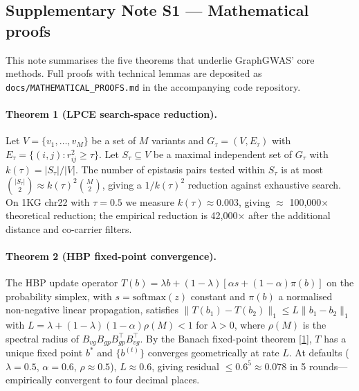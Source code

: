\clearpage


\subsection*{Supplementary Note S1 --- Mathematical proofs}\label{snote:proofs}

This note summarises the five theorems that underlie GraphGWAS'
core methods. Full proofs with technical lemmas are deposited as
\texttt{docs/MATHEMATICAL\_PROOFS.md} in the accompanying code
repository.

\paragraph{Theorem 1 (LPCE search-space reduction).}
Let $V = \{v_1, \dots, v_M\}$ be a set of $M$ variants and
$G_\tau = (V, E_\tau)$ with $E_\tau = \{(i,j) : r^2_{ij} \geq \tau\}$.
Let $S_\tau \subseteq V$ be a maximal independent set of $G_\tau$
with $k(\tau) = |S_\tau|/|V|$. The number of epistasis pairs tested
within $S_\tau$ is at most
$\binom{|S_\tau|}{2} \approx k(\tau)^2 \binom{M}{2}$, giving a
$1/k(\tau)^2$ reduction against exhaustive search. On 1KG chr22
with $\tau{=}0.5$ we measure $k(\tau) \approx 0.003$, giving
$\approx$ 100{,}000$\times$ theoretical reduction; the empirical
reduction is 42{,}000$\times$ after the additional distance and
co-carrier filters.

\paragraph{Theorem 2 (HBP fixed-point convergence).}
The HBP update operator
$T(b) = \lambda b + (1-\lambda)[\alpha s + (1-\alpha) \pi(b)]$ on
the probability simplex, with $s = \text{softmax}(z)$ constant and
$\pi(b)$ a normalised non-negative linear propagation, satisfies
$\|T(b_1) - T(b_2)\|_1 \leq L \|b_1 - b_2\|_1$ with
$L = \lambda + (1-\lambda)(1-\alpha) \rho(M) < 1$ for $\lambda > 0$,
where $\rho(M)$ is the spectral radius of
$B_{vg} B_{gp} B_{gp}^\top B_{vg}^\top$. By the Banach fixed-point
theorem [\hyperref[snote_S1_ref1]{1}], $T$ has a unique fixed point
$b^*$ and $\{b^{(t)}\}$ converges geometrically at rate $L$. At defaults
($\lambda{=}0.5$, $\alpha{=}0.6$, $\rho \approx 0.5$),
$L \approx 0.6$, giving residual $\leq 0.6^5 \approx 0.078$ in 5
rounds---empirically convergent to four decimal places.

